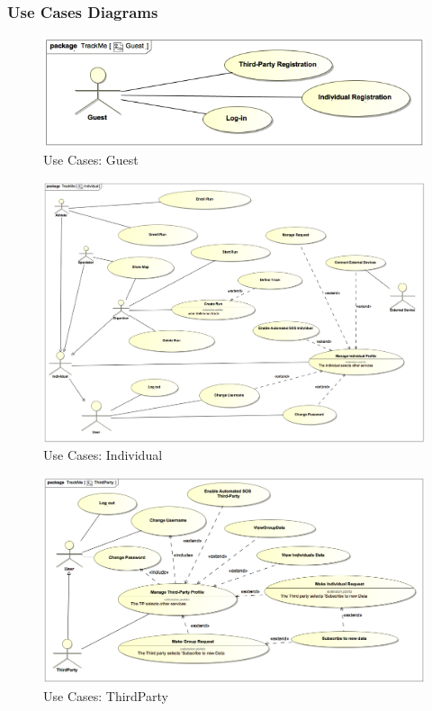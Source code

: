 \documentclass[a4paper]{article}
\begin{document}
    \subsubsection{Use Cases Diagrams}
        
        \begin{figure}[!htpb]
    	\centering
    	\includegraphics[width=\textwidth]{images/UML/Guest.jpg}
    	\caption{Use Cases: Guest}
    	\end{figure}
        \begin{figure}[!htpb]
    	\centering
    	\includegraphics[width=\textwidth]{images/UML/Individual.jpg}
    	\caption{Use Cases: Individual}
    	\end{figure}
    	\begin{figure}[!htpb]
    	\centering
    	\includegraphics[width=\textwidth]{images/UML/ThirdParty.jpg}
    	\caption{Use Cases: ThirdParty}
        \end{figure}
\end{document}
